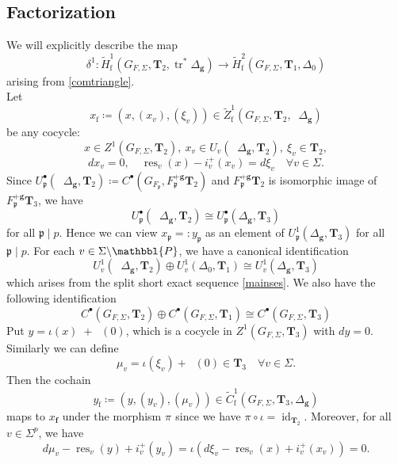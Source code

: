 \documentclass[10pt]{amsart}
\numberwithin{equation}{section}
\theoremstyle{definition}
\theoremstyle{remark} %
\newcommand{\ba}{\backslash}
\DeclareMathOperator{\res}{res}
\DeclareMathOperator{\tr}{{tr}^*}
\newcommand{\f}{\mathbf{f}}
\newcommand{\g}{\mathbf{g}}
\newcommand{\p}{\mathfrak{p}}
\newcommand{\bP}{\mathbbl{P}}
\newcommand{\T}{\mathbf{T}}
\begin{document}
		\subsection{Factorization}
		We will explicitly describe the map 
		$$ \delta^1 \colon \widetilde{H}^1_{\mathrm{f}}(G_{F,\Sigma}, \T_2, \operatorname{tr}^*\Delta_{\g}) \longrightarrow \widetilde{H}^2_{\mathrm{f}}(G_{F,\Sigma}, \T_1, \Delta_{0}) $$
		arising from \ref{comtriangle}. \\
		Let \begin{equation}
			\label{cocyclex_f}
			x_{\mathrm{f}} \coloneqq (x,(x_v), (\xi_v)) \in \widetilde{Z}^1_{\mathrm{f}}\left( G_{F, \Sigma}, \T_{2}, \tr \Delta_{\g}  \right)  
		\end{equation} 
		be any cocycle: 
		$$ x \in Z^1(G_{F,\Sigma}, \T_{2}), \: x_v \in U_v(\tr \Delta_{\g}, \T_{2}), \: \xi_v \in \T_{2},   $$
		$$ dx_v = 0 , \quad \res_v(x)- i^+_v(x_v) = d\xi_v \quad \forall v \in \Sigma. $$
		Since $ U^{\bullet}_{\p}(\tr \Delta_{\g}, \T_{2}) \coloneqq C^{\bullet}(G_{F_{\p}}, F_{\p}^{+\g}\T_{2}) $ and $ F_{\p}^{+\g}\T_{2} $ is isomorphic image of $ F_{\p}^{+\g}\T_{3} $, we have  
		$$ U^{\bullet}_{\p}(\tr \Delta_{\g}, \T_{2}) \cong U^{\bullet}_{\p}(\Delta_{\g}, \T_{3}) $$
		for all $  \p \mid p $. Hence we can view $ x_{\p} =: y_{\p} $ as an element of $ U^1_{\p}(\Delta_{\g}, \T_{3}) $ for all $  \p \mid p $.
		For each $ v \in \Sigma \ba \bP $, we have a canonical identification 
		$$ U^{1}_v(\tr \Delta_{\g}, \T_{2}) \oplus U^{1}_v( \Delta_{0}, \T_{1}) \cong U^{1}_v(\Delta_{\g}, \T_{3}) $$
		which arises from the split short exact sequence \ref{mainses}. We also have the following identification 
		$$ C^{\bullet}(G_{F, \Sigma}, \T_{2}) \oplus C^{\bullet}(G_{F, \Sigma}, \T_{1}) \cong C^{\bullet}(G_{F, \Sigma}, \T_{3}) $$
		Put $ y = \iota(x) \; + \tr(0)  $, which is a cocycle in $ Z^1(G_{F,\Sigma}, \T_{3}) $ with $ dy =0 $. Similarly we can define $$ \mu_v = \iota(\xi_v) + \tr(0) \in \T_{3} \quad \forall v \in \Sigma .$$ Then the cochain $$ y_\mathrm{f} \coloneqq (y,(y_v),(\mu_v)) \in \widetilde{C}^1_{\mathrm{f}}\left( G_{F, \Sigma}, \T_{3}, \Delta_{\g}  \right) $$
		maps to $ x_\f $ under the morphism $ \pi_{\tr} $ since we have $ \pi_{\tr} \circ \iota = \operatorname{id}_{\T_{2}} $. Moreover, for all $ v \in \Sigma^{p} $, we have 
		\begin{equation*}
			d\mu_v- \res_{v}(y)+ i_v^{+}(y_v) = \iota (d\xi_v - \res_{v}(x) + i_v^{+}(x_v))=0.
		\end{equation*}
		
\end{document}

